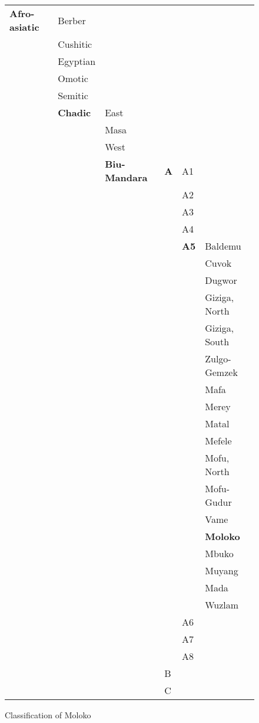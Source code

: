 \begin{figure}
\begin{tabular}{llllll}
\textbf{Afro-asiatic}  &  Berber\\
&    Cushitic\\
&    Egyptian\\
&    Omotic\\
&    Semitic\\
&    \textbf{Chadic} &  East\\
 & &     Masa\\
& &      West\\
& &\textbf{Biu-Mandara}  &  \textbf{A}  &  A1\\
& & & &           A2\\
& & & &           A3\\
& & & &            A4\\
& & & &          \textbf{A5}  &  Baldemu\\
& & & & &             Cuvok\\
& & & & &              Dugwor\\
& & & & &             Giziga, North\\
& & & & &              Giziga, South\\
& & & & &            Zulgo-Gemzek\\
& & & & &             Mafa\\
& & & & &            Merey\\
& & & & &             Matal\\
& & & & &            Mefele\\
& & & & &             Mofu, North\\
& & & & &            Mofu-Gudur\\
& & & & &            Vame\\
& & & & &            \textbf{Moloko}\\
& & & & &              Mbuko\\
& & & & &     Muyang\\
& & & & &              Mada\\
& & & & &              Wuzlam\\
& & & &             A6\\
& & & &             A7\\
& & & &            A8\\
& & &           B\\
& & &           C
\end{tabular}

\caption{Classification of Moloko}
\end{figure}

